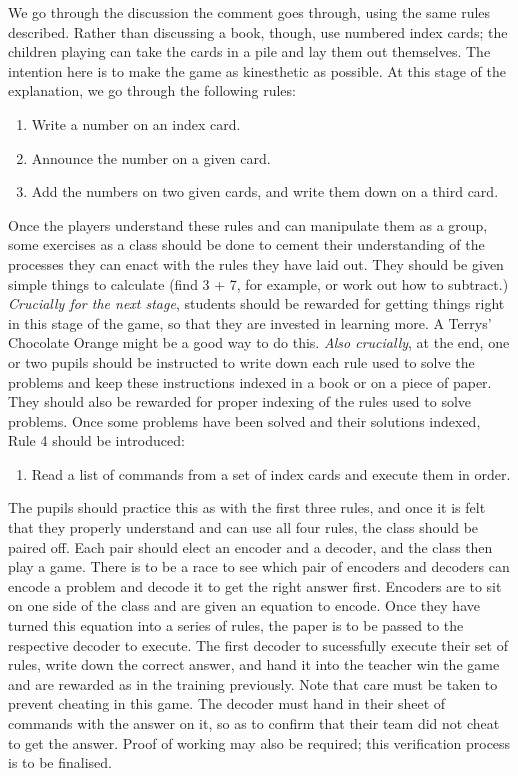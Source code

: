 \documentclass[a4paper]{article}
\begin{document}
\begin{adjustwidth}{2em}{2em}
We go through the discussion the comment goes through, using the same rules described. Rather than discussing a book, though, use numbered index cards; the children playing can take the cards in a pile and lay them out themselves. The intention here is to make the game as kinesthetic as possible. At this stage of the explanation, we go through the following rules:
\begin{enumerate}
	\item Write a number on an index card.
	\item Announce the number on a given card.
	\item Add the numbers on two given cards, and write them down on a third card.
\end{enumerate}
Once the players understand these rules and can manipulate them as a group, some exercises as a class should be done to cement their understanding of the processes they can enact with the rules they have laid out. They should be given simple things to calculate (find 3 + 7, for example, or work out how to subtract.) \emph{Crucially for the next stage}, students should be rewarded for getting things right in this stage of the game, so that they are invested in learning more. A Terrys' Chocolate Orange might be a good way to do this. \emph{Also crucially}, at the end, one or two pupils should be instructed to write down each rule used to solve the problems and keep these instructions indexed in a book or on a piece of paper. They should also be rewarded for proper indexing of the rules used to solve problems.
Once some problems have been solved and their solutions indexed, Rule 4 should be introduced: 
\begin{enumerate}\addtocounter{enumi}{3}
	\item Read a list of commands from a set of index cards and execute them in order.
\end{enumerate}
The pupils should practice this as with the first three rules, and once it is felt that they properly understand and can use all four rules, the class should be paired off. 
Each pair should elect an encoder and a decoder, and the class then play a game. There is to be a race to see which pair of encoders and decoders can encode a problem and decode it to get the right answer first. 
Encoders are to sit on one side of the class and are given an equation to encode. Once they have turned this equation into a series of rules, the paper is to be passed to the respective decoder to execute. The first decoder to sucessfully execute their set of rules, write down the correct answer, and hand it into the teacher win the game and are rewarded as in the training previously. 
Note that care must be taken to prevent cheating in this game. The decoder must hand in their sheet of commands with the answer on it, so as to confirm that their team did not cheat to get the answer. Proof of working may also be required; this verification process is to be finalised. 
\end{adjustwidth}
\end{document}
